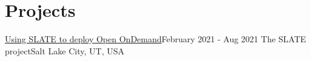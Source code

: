 \section{Projects}
\mySubHeadingListStart

  \mySubHeading
  {\href{https://slateci.io/blog/slate-open-ondemand.html}{\textcolor{linkcolor}{Using SLATE to deploy Open OnDemand}}}{February 2021 - Aug 2021}
  {The SLATE project}{Salt Lake City, UT, USA}
  \myItemListStart
  \myItemListEnd

\mySubHeadingListEnd
